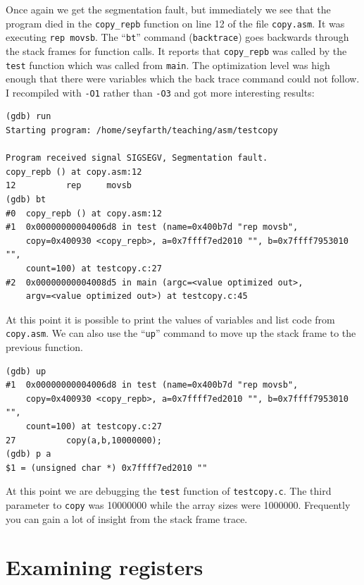 \documentclass[11pt,b5paper]{book}
\begin{document}
Once again we get the segmentation fault, but immediately we see that the program died in
the {\tt copy\_repb} function on line 12 of the file {\tt copy.asm}.
It was executing {\tt rep movsb}.
The ``{\tt bt}'' command ({\tt backtrace}) goes backwards through the stack frames for function calls.
It reports that {\tt copy\_repb} was called by the {\tt test} function which was called from {\tt main}.
The optimization level was high enough that there were variables which the back trace command could not
follow.
I recompiled with {\tt -O1} rather than {\tt -O3} and got more interesting results:
\begin{verbatim}
(gdb) run
Starting program: /home/seyfarth/teaching/asm/testcopy 

Program received signal SIGSEGV, Segmentation fault.
copy_repb () at copy.asm:12
12          rep     movsb
(gdb) bt
#0  copy_repb () at copy.asm:12
#1  0x00000000004006d8 in test (name=0x400b7d "rep movsb", 
    copy=0x400930 <copy_repb>, a=0x7ffff7ed2010 "", b=0x7ffff7953010 "", 
    count=100) at testcopy.c:27
#2  0x00000000004008d5 in main (argc=<value optimized out>, 
    argv=<value optimized out>) at testcopy.c:45
\end{verbatim}

At this point it is possible to print the values of variables and list code from {\tt copy.asm}.
We can also use the ``{\tt up}'' command to move up the stack frame to the previous function.

\begin{verbatim}
(gdb) up
#1  0x00000000004006d8 in test (name=0x400b7d "rep movsb", 
    copy=0x400930 <copy_repb>, a=0x7ffff7ed2010 "", b=0x7ffff7953010 "", 
    count=100) at testcopy.c:27
27          copy(a,b,10000000);
(gdb) p a
$1 = (unsigned char *) 0x7ffff7ed2010 ""
\end{verbatim}

At this point we are debugging the {\tt test} function of {\tt testcopy.c}.
The third parameter to {\tt copy} was 10000000 while the array sizes were 1000000.
Frequently you can gain a lot of insight from the stack frame trace.

\section{Examining registers}
\end{document}
